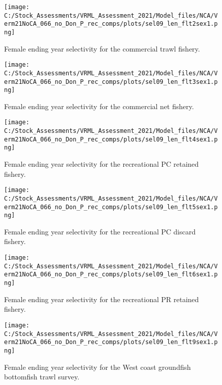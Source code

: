 \documentclass[11pt,
  english,
  a4paper,
]{article}
\begin{document}
\begin{figure}
\centering
\texttt{[image: C:/Stock\_Assessments/VRML\_Assessment\_2021/Model\_files/NCA/Verm21NoCA\_066\_no\_Don\_P\_rec\_comps/plots/sel09\_len\_flt2sex1.png]}
\caption{Female ending year selectivity for the commercial trawl fishery.\label{fig:endyr-selex-COM-TWL}}
\end{figure}

\begin{figure}
\centering
\texttt{[image: C:/Stock\_Assessments/VRML\_Assessment\_2021/Model\_files/NCA/Verm21NoCA\_066\_no\_Don\_P\_rec\_comps/plots/sel09\_len\_flt3sex1.png]}
\caption{Female ending year selectivity for the commercial net fishery.\label{fig:endyr-selex-COM-NET}}
\end{figure}

\begin{figure}
\centering
\texttt{[image: C:/Stock\_Assessments/VRML\_Assessment\_2021/Model\_files/NCA/Verm21NoCA\_066\_no\_Don\_P\_rec\_comps/plots/sel09\_len\_flt4sex1.png]}
\caption{Female ending year selectivity for the recreational PC retained fishery.\label{fig:endyr-selex-REC-PC}}
\end{figure}

\begin{figure}
\centering
\texttt{[image: C:/Stock\_Assessments/VRML\_Assessment\_2021/Model\_files/NCA/Verm21NoCA\_066\_no\_Don\_P\_rec\_comps/plots/sel09\_len\_flt5sex1.png]}
\caption{Female ending year selectivity for the recreational PC discard fishery.\label{fig:endyr-selex-REC-PC-DIS}}
\end{figure}

\begin{figure}
\centering
\texttt{[image: C:/Stock\_Assessments/VRML\_Assessment\_2021/Model\_files/NCA/Verm21NoCA\_066\_no\_Don\_P\_rec\_comps/plots/sel09\_len\_flt6sex1.png]}
\caption{Female ending year selectivity for the recreational PR retained fishery.\label{fig:endyr-selex-REC-PR}}
\end{figure}

\begin{figure}
\centering
\texttt{[image: C:/Stock\_Assessments/VRML\_Assessment\_2021/Model\_files/NCA/Verm21NoCA\_066\_no\_Don\_P\_rec\_comps/plots/sel09\_len\_flt9sex1.png]}
\caption{Female ending year selectivity for the West coast groundfish bottomfish trawl survey.\label{fig:endyr-selex-NWFSC-TWL}}
\end{figure}
\end{document}
